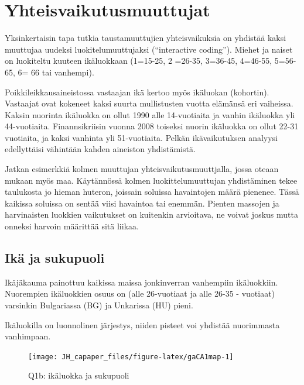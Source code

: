 \documentclass[
  finnish,
]{book}
\begin{document}
\hypertarget{yhteisvaikutusmuuttujat}{%
\chapter{Yhteisvaikutusmuuttujat}\label{yhteisvaikutusmuuttujat}}

Yksinkertaisin tapa tutkia taustamuuttujien yhteisvaikuksia on yhdistää kaksi
muuttujaa uudeksi luokitelumuuttujaksi (``interactive coding''). Miehet ja naiset
on luokiteltu kuuteen ikäluokkaan (1=15-25, 2 =26-35, 3=36-45, 4=46-55, 5=56-65,
6= 66 tai vanhempi).

Poikkileikkausaineistossa vastaajan ikä kertoo myös ikäluokan (kohortin).
Vastaajat ovat kokeneet kaksi suurta mullistusten vuotta elämänsä eri vaiheissa.
Kaksin nuorinta ikäluokka on ollut 1990 alle 14-vuotiaita ja vanhin ikäluokka
yli 44-vuotiaita. Finannsikriisin vuonna 2008 toiseksi nuorin ikäluokka on ollut
22-31 vuotiaita, ja kaksi vanhinta yli 51-vuotiaita. Pelkän ikävaikutuksen
analyysi edellyttäisi vähintään kahden aineiston yhdistämistä.

Jatkan esimerkkiä kolmen muuttujan yhteisvaikutusmuuttjalla, jossa oteaan mukaan
myös maa. Käytännössä kolmen luokittelumuuttujan yhdistäminen tekee taulukosta
jo hieman huteron, joissain soluissa havaintojen määrä pienenee. Tässä kaikissa
soluissa on sentää viisi havaintoa tai enemmän. Pienten massojen ja harvinaisten
luokkien vaikutukset on kuitenkin arvioitava, ne voivat joskus mutta onneksi
harvoin määrittää sitä liikaa.

\hypertarget{ikuxe4-ja-sukupuoli}{%
\section{Ikä ja sukupuoli}\label{ikuxe4-ja-sukupuoli}}

Ikäjäkauma painottuu kaikissa maissa jonkinverran vanhempiin ikäluokkiin.
Nuorempien ikäluokkien osuus on (alle 26-vuotiaat ja alle 26-35 - vuotiaat)
varsinkin Bulgariassa (BG) ja Unkarissa (HU) pieni.

Ikäluokilla on luonnolinen järjestys, niiden pisteet voi yhdistää nuorimmasta
vanhimpaan.

\begin{figure}

{\centering \texttt{[image: JH\_capaper\_files/figure-latex/gaCA1map-1]} 

}

\caption{Q1b: ikäluokka ja sukupuoli}\label{fig:gaCA1map}
\end{figure}
\end{document}
